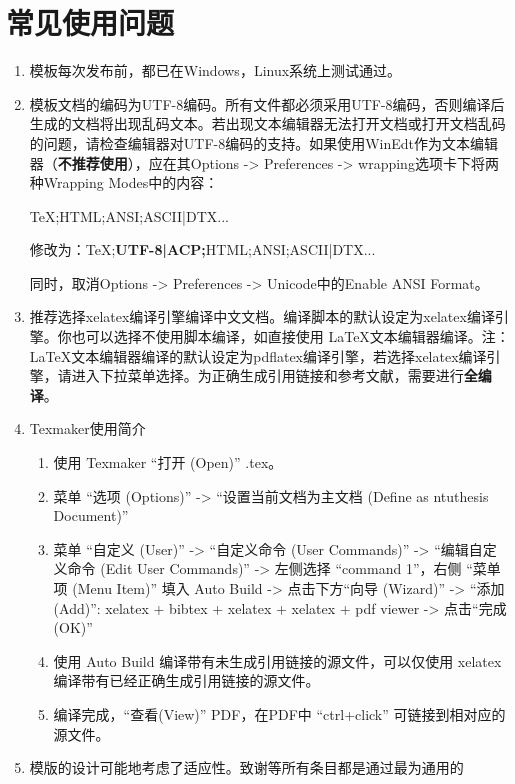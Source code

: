
\chapter{常见使用问题}\label{cha:question}

\begin{enumerate}
    \item 模板每次发布前，都已在Windows，Linux系统上测试通过。

    \item 模板文档的编码为UTF-8编码。所有文件都必须采用UTF-8编码，否则编译后生成的文档将出现乱码文本。若出现文本编辑器无法打开文档或打开文档乱码的问题，请检查编辑器对UTF-8编码的支持。如果使用WinEdt作为文本编辑器（\textbf{不推荐使用}），应在其Options -> Preferences -> wrapping选项卡下将两种Wrapping Modes中的内容： 
    
        TeX;HTML;ANSI;ASCII|DTX...
        
        修改为：TeX;\textbf{UTF-8|ACP;}HTML;ANSI;ASCII|DTX...
        
        同时，取消Options -> Preferences -> Unicode中的Enable ANSI Format。

    \item 推荐选择xelatex编译引擎编译中文文档。编译脚本的默认设定为xelatex编译引擎。你也可以选择不使用脚本编译，如直接使用 \LaTeX{}文本编辑器编译。注：\LaTeX{}文本编辑器编译的默认设定为pdflatex编译引擎，若选择xelatex编译引擎，请进入下拉菜单选择。为正确生成引用链接和参考文献，需要进行\textbf{全编译}。

    \item Texmaker使用简介
        \begin{enumerate}
            \footnotesize
            \item 使用 Texmaker “打开 (Open)” \projectname.tex。
            \item 菜单 “选项 (Options)” -> “设置当前文档为主文档 (Define as ntuthesis Document)”
            \item 菜单 “自定义 (User)” -> “自定义命令 (User Commands)” -> “编辑自定义命令 (Edit User Commands)” -> 左侧选择 “command 1”，右侧 “菜单项 (Menu Item)” 填入 Auto Build -> 点击下方“向导 (Wizard)” -> “添加 (Add)”: xelatex + bibtex + xelatex + xelatex + pdf viewer -> 点击“完成 (OK)”
            \item 使用 Auto Build 编译带有未生成引用链接的源文件，可以仅使用 xelatex 编译带有已经正确生成引用链接的源文件。
            \item 编译完成，“查看(View)” PDF，在PDF中 “ctrl+click” 可链接到相对应的源文件。
        \end{enumerate}
    \item 模版的设计可能地考虑了适应性。致谢等所有条目都是通过最为通用的


\end{enumerate}
